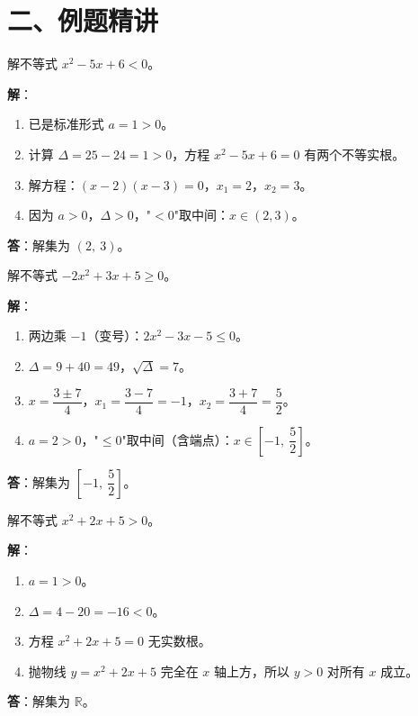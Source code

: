 \documentclass[12pt, a4paper]{ctexart}
\begin{document}
\section*{\textcolor{examorange}{二、例题精讲}}

\begin{examplebox}[【例1】解一元二次不等式]
解不等式 $x^2 - 5x + 6 < 0$。
\end{examplebox}

\textbf{解}：
\begin{enumerate}[leftmargin=2em]
  \item 已是标准形式 $a = 1 > 0$。
  \item 计算 $\Delta = 25 - 24 = 1 > 0$，方程 $x^2 - 5x + 6 = 0$ 有两个不等实根。
  \item 解方程：$(x-2)(x-3) = 0$，$x_1 = 2$，$x_2 = 3$。
  \item 因为 $a > 0$，$\Delta > 0$，"$< 0$"取中间：$x \in (2, 3)$。
\end{enumerate}
\textbf{答}：解集为 $\boxed{(2,\ 3)}$。

\begin{examplebox}[【例2】解含负系数的一元二次不等式]
解不等式 $-2x^2 + 3x + 5 \geq 0$。
\end{examplebox}

\textbf{解}：
\begin{enumerate}[leftmargin=2em]
  \item 两边乘 $-1$（变号）：$2x^2 - 3x - 5 \leq 0$。
  \item $\Delta = 9 + 40 = 49$，$\sqrt{\Delta} = 7$。
  \item $x = \dfrac{3 \pm 7}{4}$，$x_1 = \dfrac{3-7}{4} = -1$，$x_2 = \dfrac{3+7}{4} = \dfrac{5}{2}$。
  \item $a = 2 > 0$，"$\leq 0$"取中间（含端点）：$x \in \left[-1,\ \dfrac{5}{2}\right]$。
\end{enumerate}
\textbf{答}：解集为 $\boxed{\left[-1,\ \dfrac{5}{2}\right]}$。

\begin{examplebox}
解不等式 $x^2 + 2x + 5 > 0$。
\end{examplebox}

\textbf{解}：
\begin{enumerate}[leftmargin=2em]
  \item $a = 1 > 0$。
  \item $\Delta = 4 - 20 = -16 < 0$。
  \item 方程 $x^2 + 2x + 5 = 0$ 无实数根。
  \item 抛物线 $y = x^2 + 2x + 5$ 完全在 $x$ 轴上方，所以 $y > 0$ 对所有 $x$ 成立。
\end{enumerate}
\textbf{答}：解集为 $\boxed{\mathbb{R}}$。
\end{document}
